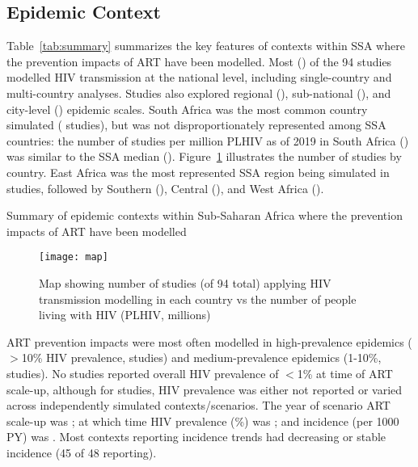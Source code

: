 \subsection{Epidemic Context}
\label{ss:res:context}
Table~\ref{tab:summary} summarizes the key features of contexts within SSA
where the prevention impacts of ART have been modelled.
Most () of the 94 studies modelled HIV transmission at the national level,
including  single-country and  multi-country analyses.
Studies also explored
regional (),
sub-national (), and
city-level () epidemic scales.
South Africa was the most common country simulated ( studies),
but was not disproportionately represented among SSA countries:
the number of studies per million PLHIV as of 2019 in South Africa ()
was similar to the SSA median ().
Figure~\ref{fig:map} illustrates the number of studies by country.
East Africa was the most represented SSA region being simulated in  studies,
followed by Southern (), Central (), and West Africa ().
\begin{table}
  \centering
  \caption{Summary of epidemic contexts within Sub-Saharan Africa where
    the prevention impacts of ART have been modelled}
  \label{tab:summary}
  
\end{table}
\begin{figure}
  \centering
  \texttt{[image: map]}
  \caption{Map showing number of studies (of 94 total)
    applying HIV transmission modelling in each country vs
    the number of people living with HIV (PLHIV, millions)}
  \label{fig:map}
\end{figure}
\par
ART prevention impacts were most often modelled in
high-prevalence epidemics ({$>$10\%} HIV prevalence,  studies) and
medium-prevalence epidemics ({1-10\%},  studies).
No studies reported overall HIV prevalence of {$<$1\%} at time of ART scale-up,
although for  studies, HIV prevalence was either
not reported or varied across independently simulated contexts/scenarios.
The \xdmdef year of scenario ART scale-up was ; at which time
HIV prevalence (\%) was ; and
incidence (per 1000 PY) was .
Most contexts reporting incidence trends had decreasing or stable incidence
(45 of 48 reporting). %
